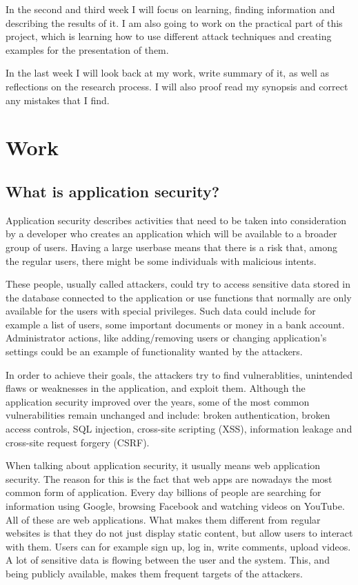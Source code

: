 \documentclass[a4paper]{article}
\begin{document}
In the second and third week I will focus on learning, finding information and
describing the results of it. I am also going to work on the practical part of
this project, which is learning how to use different attack techniques and
creating examples for the presentation of them.

In the last week I will look back at my work, write summary of it, as well as
reflections on the research process. I will also proof read my synopsis and
correct any mistakes that I find.

\newpage

\section{Work}

\subsection{What is application security?}

Application security describes activities that need to be taken into
consideration by a developer who creates an application which will be available
to a broader group of users. Having a large userbase means that there is a risk
that, among the regular users, there might be some individuals with malicious
intents.

These people, usually called attackers, could try to access sensitive data
stored in the database connected to the application or use functions that
normally are only available for the users with special privileges. Such data
could include for example a list of users, some important documents or money in
a bank account. Administrator actions, like adding/removing users or changing
application's settings could be an example of functionality wanted by the
attackers.

In order to achieve their goals, the attackers try to find vulnerablities,
unintended flaws or weaknesses in the application, and exploit them. Although
the application security improved over the years, some of the most common
vulnerabilities remain unchanged and include: broken authentication, broken
access controls, SQL injection, cross-site scripting (XSS), information leakage
and cross-site request forgery (CSRF).

When talking about application security, it usually means web application
security. The reason for this is the fact that web apps are nowadays the most
common form of application. Every day billions of people are searching for
information using Google, browsing Facebook and watching videos on YouTube. All
of these are web applications. What makes them different from regular websites
is that they do not just display static content, but allow users to interact
with them. Users can for example sign up, log in, write comments, upload videos.
A lot of sensitive data is flowing between the user and the system. This, and
being publicly available, makes them frequent targets of the attackers.
\end{document}

